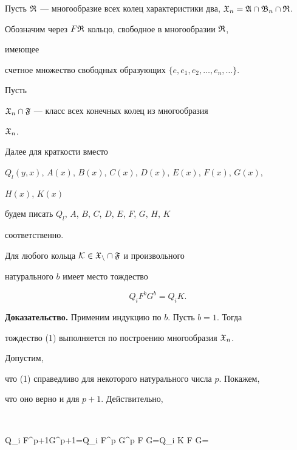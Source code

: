  


Пусть $\frak R$ --- многообразие всех колец характеристики два, $\frak 


X_n=\frak A\cap\frak B_n\cap\frak R$. 


Обозначим через $F\frak R$ кольцо, свободное в многообразии $\frak R$, 


имеющее  


счетное множество свободных образующих $\{e,e_1,e_2,\dotsc,e_n,\dotsc\}$. 


Пусть  


$\frak X_n\cap\frak F$ --- класс всех конечных колец из многообразия 


$\frak X_n$. 


 


Далее для краткости вместо 


$Q_l(y,x)$, $A(x)$, $B(x)$, $C(x)$, $D(x)$, $E(x)$, $F(x)$, $G(x)$, 


$H(x)$, $K(x)$ 


будем писать $Q_l$, $A$, $B$, $C$, $D$, $E$, $F$, $G$, $H$, $K$ 


соответственно. 


 


\begin{lem} 


Для любого кольца $\cal K\in\frak X_n\cap\frak F$ и произвольного 


натурального $b$ имеет место тождество 


\begin{equation} 


Q_i F^b G^b=Q_i K. 


\end{equation} 


\end{lem} 


 


{\bf Доказательство.} Применим индукцию по $b$. Пусть $b=1$. Тогда  


тождество (1) выполняется по построению многообразия $\frak X_n$. 


Допустим,  


что (1) справедливо для некоторого натурального числа $p$. Покажем,  


что оно верно и для $p+1$. Действительно, 


$$ 


Q_i F^{p+1}G^{p+1}=Q_i F^p G^p F G=Q_i K F G= 


